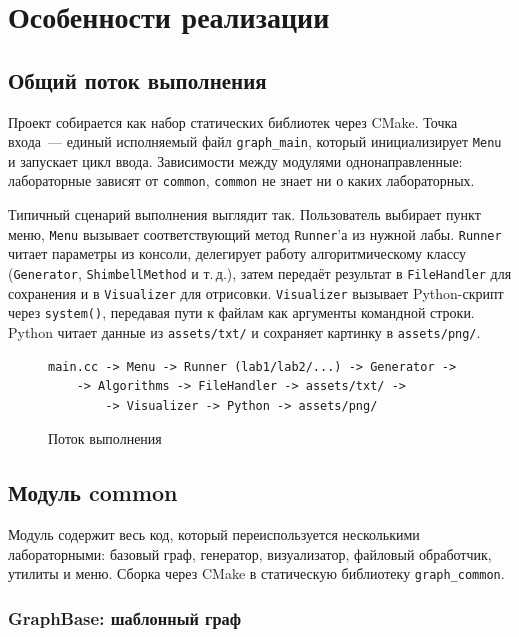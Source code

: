 \section{Особенности реализации}

\subsection{Общий поток выполнения}

Проект собирается как набор статических библиотек через CMake. Точка входа~---
единый исполняемый файл \texttt{graph\_main}, который инициализирует
\texttt{Menu} и запускает цикл ввода. Зависимости между модулями
однонаправленные: лабораторные зависят от \texttt{common}, \texttt{common}
не знает ни о каких лабораторных.

Типичный сценарий выполнения выглядит так. Пользователь выбирает пункт меню,
\texttt{Menu} вызывает соответствующий метод \texttt{Runner}'а из нужной лабы.
\texttt{Runner} читает параметры из консоли, делегирует работу алгоритмическому
классу (\texttt{Generator}, \texttt{ShimbellMethod} и т.\,д.), затем передаёт
результат в \texttt{FileHandler} для сохранения и в \texttt{Visualizer} для
отрисовки. \texttt{Visualizer} вызывает Python-скрипт через \texttt{system()},
передавая пути к файлам как аргументы командной строки. Python читает данные
из \texttt{assets/txt/} и сохраняет картинку в \texttt{assets/png/}.

\begin{figure}[h]
\centering
\begin{verbatim}
main.cc -> Menu -> Runner (lab1/lab2/...) -> Generator ->
    -> Algorithms -> FileHandler -> assets/txt/ -> 
        -> Visualizer -> Python -> assets/png/
\end{verbatim}

\caption{Поток выполнения}
\end{figure}

\subsection{Модуль common}

Модуль содержит весь код, который переиспользуется несколькими лабораторными:
базовый граф, генератор, визуализатор, файловый обработчик, утилиты и меню.
Сборка через CMake в статическую библиотеку \texttt{graph\_common}.

\subsubsection{GraphBase: шаблонный граф}

